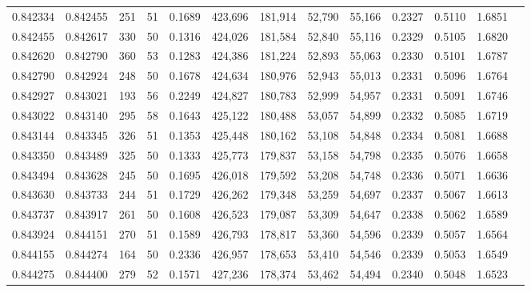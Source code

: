 \begin{tabular}{rrrrrrrrrrrrr}
0.842334 & 0.842455 &   251 &  51 &                                     0.1689 & 423,696 & 181,914 &  52,790 &  55,166 & 0.2327 & 0.5110 & 1.6851 \\
0.842455 & 0.842617 &   330 &  50 &                                     0.1316 & 424,026 & 181,584 &  52,840 &  55,116 & 0.2329 & 0.5105 & 1.6820 \\
0.842620 & 0.842790 &   360 &  53 &                                     0.1283 & 424,386 & 181,224 &  52,893 &  55,063 & 0.2330 & 0.5101 & 1.6787 \\
0.842790 & 0.842924 &   248 &  50 &                                     0.1678 & 424,634 & 180,976 &  52,943 &  55,013 & 0.2331 & 0.5096 & 1.6764 \\
0.842927 & 0.843021 &   193 &  56 &                                     0.2249 & 424,827 & 180,783 &  52,999 &  54,957 & 0.2331 & 0.5091 & 1.6746 \\
0.843022 & 0.843140 &   295 &  58 &                                     0.1643 & 425,122 & 180,488 &  53,057 &  54,899 & 0.2332 & 0.5085 & 1.6719 \\
0.843144 & 0.843345 &   326 &  51 &                                     0.1353 & 425,448 & 180,162 &  53,108 &  54,848 & 0.2334 & 0.5081 & 1.6688 \\
0.843350 & 0.843489 &   325 &  50 &                                     0.1333 & 425,773 & 179,837 &  53,158 &  54,798 & 0.2335 & 0.5076 & 1.6658 \\
0.843494 & 0.843628 &   245 &  50 &                                     0.1695 & 426,018 & 179,592 &  53,208 &  54,748 & 0.2336 & 0.5071 & 1.6636 \\
0.843630 & 0.843733 &   244 &  51 &                                     0.1729 & 426,262 & 179,348 &  53,259 &  54,697 & 0.2337 & 0.5067 & 1.6613 \\
0.843737 & 0.843917 &   261 &  50 &                                     0.1608 & 426,523 & 179,087 &  53,309 &  54,647 & 0.2338 & 0.5062 & 1.6589 \\
0.843924 & 0.844151 &   270 &  51 &                                     0.1589 & 426,793 & 178,817 &  53,360 &  54,596 & 0.2339 & 0.5057 & 1.6564 \\
0.844155 & 0.844274 &   164 &  50 &                                     0.2336 & 426,957 & 178,653 &  53,410 &  54,546 & 0.2339 & 0.5053 & 1.6549 \\
0.844275 & 0.844400 &   279 &  52 &                                     0.1571 & 427,236 & 178,374 &  53,462 &  54,494 & 0.2340 & 0.5048 & 1.6523 \\

\end{tabular}
